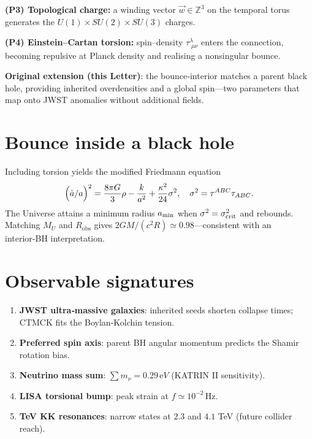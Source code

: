 \documentclass[reprint,amsmath,amssymb,aps,prd,nofootinbib]{revtex4-2}
\begin{document}
\textbf{(P3) Topological charge:} a winding vector $\vec{w}\in\mathbb Z^{3}$ on the temporal torus generates the $U(1)\times SU(2)\times SU(3)$ charges.

\textbf{(P4) Einstein–Cartan torsion:} spin–density $\tau^{\lambda}_{\;\mu\nu}$ enters the connection, becoming repulsive at Planck density and realising a nonsingular bounce.

\textbf{Original extension (this Letter)}: the bounce‑interior matches a parent black hole, providing inherited overdensities and a global spin—two parameters that map onto JWST anomalies without additional fields.

\section{Bounce inside a black hole}
Including torsion yields the modified Friedmann equation
\begin{equation}
  \Bigl(\dot a/a\Bigr)^{2}=\frac{8\pi G}{3}\rho-\frac{k}{a^{2}}+\frac{\kappa^{2}}{24}\sigma^{2}, \quad \sigma^{2}=\tau^{ABC}\tau_{ABC}.
\end{equation}
The Universe attains a minimum radius $a_{\rm min}$ when $\sigma^{2}=\sigma_{\rm crit}^{2}$ and rebounds.  Matching $M_{U}$ and $R_{\text{obs}}$ gives $2GM/(c^{2}R)\simeq0.98$—consistent with an interior‑BH interpretation.

\section{Observable signatures}
\begin{enumerate}
  \item \textbf{JWST ultra‑massive galaxies}: inherited seeds shorten collapse times; CTMCK fits the Boylan‑Kolchin tension.
  \item \textbf{Preferred spin axis}: parent BH angular momentum predicts the Shamir rotation bias.
  \item \textbf{Neutrino mass sum}: $\sum m_{\nu}=0.29\,\mathrm eV$ (KATRIN II sensitivity).
  \item \textbf{LISA torsional bump}: peak strain at $f\!\simeq\!10^{-2}\,$Hz.
  \item \textbf{TeV KK resonances}: narrow states at $2.3$ and $4.1$ TeV (future collider reach).
\end{enumerate}

\end{document}
